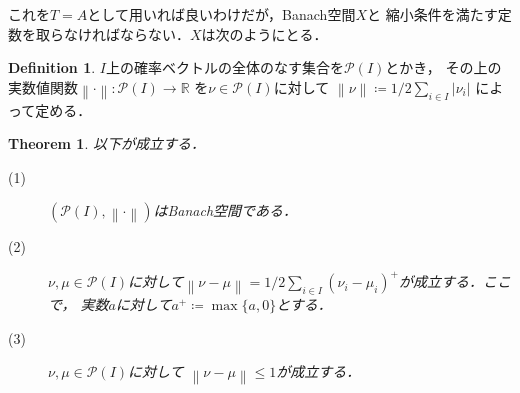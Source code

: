 \documentclass[dvipdfmx,autodetect-engine]{jsarticle}
\newtheorem{theorem}{Theorem}[section]
\theoremstyle{remark}
\theoremstyle{definition}
\newtheorem{definition}{Definition}[section]
\newcommand{\R}{\mathbb{R}}
\newcommand{\abs}[1]{\left\lvert#1\right\rvert}%
\newcommand{\norm}[1]{\left\lVert#1\right\rVert}%
\begin{document}
これを$T=A$として用いれば良いわけだが，Banach空間$X$と
縮小条件を満たす定数を取らなければならない．$X$は次のようにとる．


\begin{definition}
    $I$上の確率ベクトルの全体のなす集合を$\mathcal{P}(I)$とかき，
    その上の実数値関数$\norm{\cdot} \colon \mathcal{P}(I) \to \R$
    を$\nu \in \mathcal{P}(I)$に対して
    $\norm{\nu} \coloneqq1/2 \sum_{i \in I}\abs{\nu_{i}}$
    によって定める．
\end{definition}


\begin{theorem}
    以下が成立する．
    \begin{description}
        \item[(1)] $(\mathcal{P}(I),\norm{\cdot})$はBanach空間である．
        \item[(2)] $\nu,\mu \in \mathcal{P}(I)$に対して$\norm{\nu - \mu} = 
        1/2 \sum_{i \in I} (\nu_{i} - \mu_{i})^{+}$が成立する．ここで，
        実数$a$に対して$a^{+} \coloneqq \max\{a,0\}$とする．
        \item[(3)] $\nu,\mu \in \mathcal{P}(I)$に対して
        $\norm{\nu - \mu} \leq 1$が成立する．
    \end{description}
\end{theorem}
\end{document}
